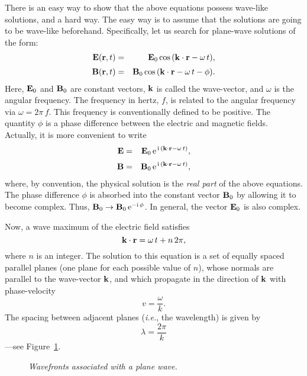 There is an easy way to show that the above equations possess wave-like
solutions, and a hard way. The easy way is to assume that the solutions  are
going to be wave-like beforehand. Specifically, let us search for
plane-wave solutions of the form:
\begin{eqnarray}
{\bf E}({\bf r}, t) &=& {\bf E}_0 \cos\,({\bf k}\cdot {\bf r} - \omega\, t),
 \\[0.5ex]
{\bf B}({\bf r}, t) &=& {\bf B}_0 \cos\,({\bf k}\cdot {\bf r} - \omega\, t-\phi).
\end{eqnarray}
Here, ${\bf E}_0$ and ${\bf B}_0$ are constant vectors, ${\bf k}$ is called
the wave-vector, and $\omega$ is the angular frequency. The frequency
in hertz, $f$, is related to the angular frequency via $\omega = 2\pi\,f$. 
This frequency is conventionally defined to be positive. The quantity
$\phi$ is a phase difference between the electric and magnetic fields. 
Actually, it is more convenient to write 
\begin{eqnarray}\label{e4.61a}
{\bf E} &=& {\bf E}_0 \,{\rm e}^{\,{\rm i}\,({\bf k}\cdot{\bf r} - \omega \,t)},
\\[0.5ex]
{\bf B} &=& {\bf B}_0 \,{\rm e}^{\,{\rm i}\,({\bf k}\cdot{\bf r} - \omega \,t)},\label{e4.61b}
\end{eqnarray}
where, by convention, the physical solution is the {\em real part}\/ of the 
above equations. The phase difference $\phi$ is  absorbed into the
constant vector ${\bf B}_0$ by allowing it to become complex. Thus,
${\bf B}_0 \rightarrow {\bf B}_0 \,{\rm e}^{-{\rm i}\,\phi}$. In general,
the vector ${\bf E}_0$ is also complex. 

Now, a  wave maximum of the electric field satisfies 
\begin{equation}
{\bf k}\cdot {\bf r}  = \omega\, t + n\,2\pi,
\end{equation}
where $n$ is an integer. The solution to
this equation is a set of equally spaced parallel planes 
(one plane for each possible value of $n$), whose normals are parallel
to the wave-vector ${\bf k}$, and
which propagate in the direction of ${\bf k}$ with  phase-velocity
\begin{equation}\label{e4.63}
v = \frac{\omega}{k}.
\end{equation}
The spacing between adjacent planes ({\em i.e.}, the wavelength) is given by
\begin{equation}
\lambda = \frac{2\pi}{k}
\end{equation}
---see Figure~\ref{f34}.
\begin{figure}
\centerline{}
\caption{\em Wavefronts associated with a plane wave.}\label{f34}
\end{figure}


